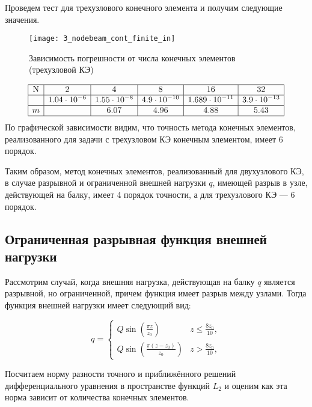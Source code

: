 \documentclass[12pt,a4paper]{article}
\begin{document}
 Проведем тест для трехузлового конечного элемента и получим следующие значения. 
\begin{figure}[H]
		\centering
		\texttt{[image: 3\_nodebeam\_cont\_finite\_in]}
		\caption{Зависимость погрешности от числа конечных элементов (трехузловой КЭ)}
		\label{fig:3_nodebeam_cont_finite_in}
	\end{figure}


\[
\begin{array}{|c|c|c|c|c|c|}
\hline
\text{N} & 2 & 4 & 8 & 16 & 32 \\ \hline
\Delta  & 1.04 \cdot 10^{-6} & 1.55 \cdot 10^{-8} & 4.9 \cdot 10^{-10} & 1.689 \cdot 10^{-11} & 3.9 \cdot 10^{-13} \\ \hline
m  &  & 6.07 & 4.96 & 4.88 & 5.43 \\ 
\hline
\end{array}
\]
По графической зависимости видим, что точность метода конечных элементов, реализованного для задачи с трехузловом КЭ конечным элементом, имеет 6 порядок. 

Таким образом, метод конечных элементов, реализованный для двухузлового КЭ, в случае разрывной и ограниченной внешней нагрузки $q$, имеющей разрыв в узле, действующей на балку, имеет 4 порядок точности, а для трехузлового КЭ --- 6 порядок. 




\subsection[Ограниченная функция внешней нагрузки с разрывом не в узле]{Ограниченная разрывная функция внешней нагрузки}

Рассмотрим случай, когда внешняя нагрузка, действующая на балку $q$ является разрывной, но ограниченной, причем функция имеет разрыв между узлами. 
Тогда функция внешней нагрузки имеет следующий вид:

\begin{equation}
q = 
 \begin{cases}
	Q \sin \left(\frac{\pi  z}{z_{0}}\right) & z \leq \frac{8 z_{0}}{10}, \\
    Q \sin \left(\frac{\pi  (z-z_{0})}{z_{0}}\right) & z > \frac{8 z_{0}}{10} ,
 \end{cases}
\end{equation}

Посчитаем норму разности точного и приближённого решений дифференциального уравнения в пространстве функций $L_{2}$  и оценим как эта норма зависит от количества конечных элементов.\\
\end{document}
